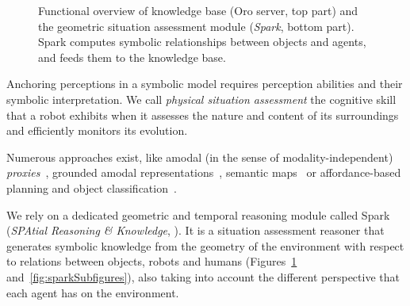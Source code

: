 \documentclass[preprint,3p,times]{elsarticle}
\begin{document}
\begin{figure}
{
}
    \caption{Functional overview of knowledge base ({\sc Oro} server, top part)
    and the geometric situation assessment module (\emph{{\sc Spark}}, bottom
    part). {\sc Spark} computes symbolic relationships between objects and
    agents, and feeds them to the knowledge base.}

        \label{fig|spark-oro}
\end{figure}

Anchoring perceptions in a symbolic model requires perception abilities and
their symbolic interpretation. We call \emph{physical situation assessment} the
cognitive skill that a robot exhibits when it assesses the nature and content of its
surroundings and efficiently monitors its evolution.

Numerous approaches exist, like amodal (in the sense of modality-independent)
\emph{proxies}~\cite{Jacobsson2008}, grounded amodal
representations~\cite{Mavridis2006}, semantic
maps~\cite{Nuechter2008, Galindo2008,Blodow2011} or affordance-based planning
and object classification~\cite{Lorken2008, Varadarajan2011}.



We rely on a dedicated geometric and temporal reasoning module called {\sc
Spark} (\emph{SPAtial Reasoning \& Knowledge}, \cite{Sisbot2011}). It is a
situation assessment reasoner that generates symbolic knowledge from the
geometry of the environment with respect to relations between objects,
robots and humans (Figures~\ref{fig|spark-oro}
and~\ref{fig:sparkSubfigures}), also taking into account the different
perspective that each agent has on the environment.
\end{document}
